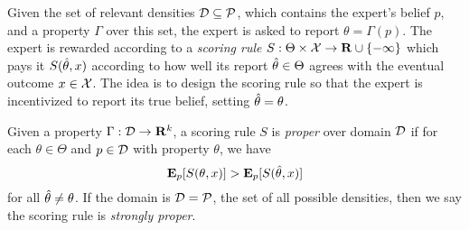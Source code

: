 Given the set of relevant densities $\mathcal{D} \subseteq \mathcal{P}$, which contains the expert's belief $p$, and a property $\Gamma$ over this set, the expert is asked to report $\theta = \Gamma(p)$. The expert is rewarded according to a \emph{scoring rule} $S : \Theta \times \mathcal{X} \rightarrow \mathbf{R} \cup \{-\infty\}$ which pays it $S(\hat{\theta},x)$ according to how well its report $\hat{\theta} \in \Theta$ agrees with the eventual outcome $x \in \mathcal{X}$. The idea is to design the scoring rule so that the expert is incentivized to report its true belief, setting $\hat{\theta} = \theta$. 
%
\begin{definition}
Given a property $\Gamma : \mathcal{D} \rightarrow \mathbf{R}^k$, a scoring rule $S$ is  \emph{proper} over domain $\mathcal{D}$ if for each $\theta \in \Theta$ and $p \in \mathcal{D}$ with property $\theta$, we have
%
\begin{equation} \label{eq-proper}
\mathbf{E}_p[S(\theta,x)] > \mathbf{E}_p[S(\hat{\theta},x)]
\end{equation}
%
for all $\hat{\theta} \neq \theta$. If the domain is $\mathcal{D} = \mathcal{P}$, the set of all possible densities, then we say the scoring rule is \emph{strongly proper}.
\end{definition}
%

